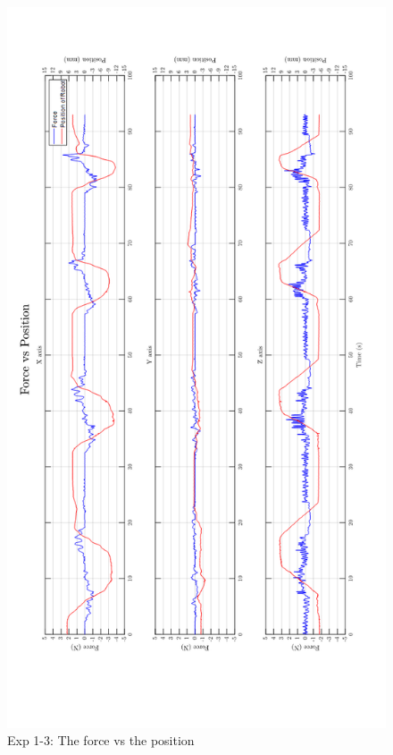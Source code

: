 \begin{figure}[htbp]
\begin{center}
\includegraphics[width=1\linewidth]{Images/exp/exp1_3_3.png}
\caption{Exp 1-3: The force vs the position}
\label{fig: exp1_3_3}
\end{center}
\end{figure}	

